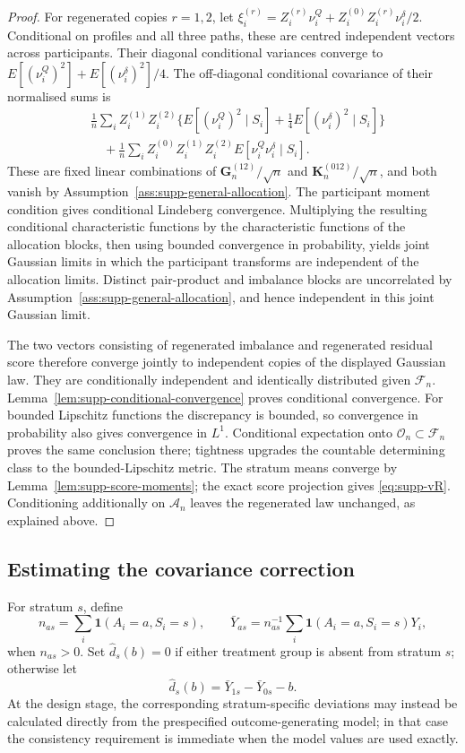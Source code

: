 \documentclass[12pt,a4paper]{article}
\theoremstyle{definition}
\theoremstyle{remark}\newtheorem{remark}{Remark}
\numberwithin{equation}{section}
\begin{document}
\begin{proof}
For regenerated copies $r=1,2$, let $\xi_i^{(r)}=Z_i^{(r)}\nu_i^Q+Z_i^{(0)}Z_i^{(r)}\nu_i^\delta/2$. Conditional on profiles and all three paths, these are centred independent vectors across participants. Their diagonal conditional variances converge to $E[(\nu_i^Q)^2]+E[(\nu_i^\delta)^2]/4$. The off-diagonal conditional covariance of their normalised sums is
\begin{align*}
 &\frac1n\sum_iZ_i^{(1)}Z_i^{(2)}
 \{E[(\nu_i^Q)^2\mid S_i]+\tfrac14E[(\nu_i^\delta)^2\mid S_i]\}\\
 &\quad+\frac1n\sum_iZ_i^{(0)}Z_i^{(1)}Z_i^{(2)}E[\nu_i^Q\nu_i^\delta\mid S_i].
\end{align*}
These are fixed linear combinations of $\bm G_n^{(12)}/\sqrt n$ and $\bm K_n^{(012)}/\sqrt n$, and both vanish by Assumption~\ref{ass:supp-general-allocation}. The participant moment condition gives conditional Lindeberg convergence. Multiplying the resulting conditional characteristic functions by the characteristic functions of the allocation blocks, then using bounded convergence in probability, yields joint Gaussian limits in which the participant transforms are independent of the allocation limits. Distinct pair-product and imbalance blocks are uncorrelated by Assumption~\ref{ass:supp-general-allocation}, and hence independent in this joint Gaussian limit.

The two vectors consisting of regenerated imbalance and regenerated residual score therefore converge jointly to independent copies of the displayed Gaussian law. They are conditionally independent and identically distributed given $\mathcal F_n$. Lemma~\ref{lem:supp-conditional-convergence} proves conditional convergence. For bounded Lipschitz functions the discrepancy is bounded, so convergence in probability also gives convergence in $L^1$. Conditional expectation onto $\mathcal O_n\subset\mathcal F_n$ proves the same conclusion there; tightness upgrades the countable determining class to the bounded-Lipschitz metric. The stratum means converge by Lemma~\ref{lem:supp-score-moments}; the exact score projection gives \eqref{eq:supp-vR}. Conditioning additionally on $\mathcal A_n$ leaves the regenerated law unchanged, as explained above.
\end{proof}

\subsection{Estimating the covariance correction}\label{sec:supp-dhat}
For stratum $s$, define
\[
n_{as}=\sum_i\mathbf 1(A_i=a,S_i=s),
\qquad
\bar Y_{as}=n_{as}^{-1}\sum_i\mathbf 1(A_i=a,S_i=s)Y_i,
\]
when $n_{as}>0$. Set $\widehat d_s(b)=0$ if either treatment group is absent from stratum $s$; otherwise let
\begin{equation}\label{eq:supp-dhat}
\widehat d_s(b)=\bar Y_{1s}-\bar Y_{0s}-b.
\end{equation}
At the design stage, the corresponding stratum-specific deviations may instead be calculated directly from the prespecified outcome-generating model; in that case the consistency requirement is immediate when the model values are used exactly.
\end{document}
